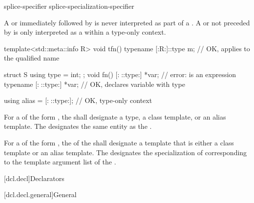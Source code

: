 \begin{bnf}
\br
    splice-specifier\br
    splice-specialization-specifier
\end{bnf}

\pnum
A  or
immediately followed by \tcode{::}
is never interpreted as part of a .
A  or
not preceded by 
is only interpreted as a 
within a type-only context.
\begin{example}
\begin{codeblock}
template<std::meta::info R> void tfn() {
  typename [:R:]::type m;       // OK,  applies to the qualified name
}

struct S { using type = int; };
void fn() {
  [:^^S::type:] *var;           // error:  is an expression
  typename [:^^S::type:] *var;  // OK, declares variable with type 
}

using alias = [:^^S::type:];    // OK, type-only context
\end{codeblock}
\end{example}

\pnum
For a  of the form
 ,
the  shall designate
a type, a class template, or an alias template.
The  designates
the same entity as the .

\pnum
For a  of the form
 ,
the  of
the 
shall designate a template 
that is either a class template or an alias template.
The  designates
the specialization of  corresponding to
the template argument list of the .
%

[dcl.decl]{Declarators}%

[dcl.decl.general]{General}%

%
%
%
%
%

